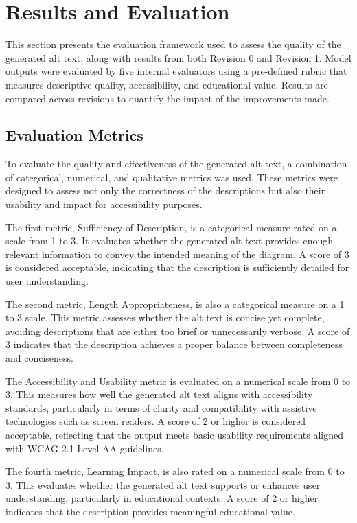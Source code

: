 \documentclass[11pt]{article}
\begin{document}
\section{Results and Evaluation}

This section presents the evaluation framework used to assess the quality of the generated alt text, along with results from both Revision 0 and Revision 1. Model outputs were evaluated by five internal evaluators using a pre-defined rubric that measures descriptive quality, accessibility, and educational value. Results are compared across revisions to quantify the impact of the improvements made.

\subsection{Evaluation Metrics} 
To evaluate the quality and effectiveness of the generated alt text, a combination of categorical, numerical, and qualitative metrics was used. 
These metrics were designed to assess not only the correctness of the descriptions but also their usability and impact for accessibility purposes.

The first metric, Sufficiency of Description, is a categorical measure rated on a scale from 1 to 3. It evaluates whether the generated alt text 
provides enough relevant information to convey the intended meaning of the diagram. A score of 3 is considered acceptable, indicating that 
the description is sufficiently detailed for user understanding.

The second metric, Length Appropriateness, is also a categorical measure on a 1 to 3 scale. This metric assesses whether the alt text is concise yet 
complete, avoiding descriptions that are either too brief or unnecessarily verbose. A score of 3 indicates that the description achieves a proper 
balance between completeness and conciseness.

The Accessibility and Usability metric is evaluated on a numerical scale from 0 to 3. This measures how well the generated alt text aligns with 
accessibility standards, particularly in terms of clarity and compatibility with assistive technologies such as screen readers. A score of 2 or higher 
is considered acceptable, reflecting that the output meets basic usability requirements aligned with WCAG 2.1 Level AA guidelines.

The fourth metric, Learning Impact, is also rated on a numerical scale from 0 to 3. This evaluates whether the generated alt text supports or enhances 
user understanding, particularly in educational contexts. A score of 2 or higher indicates that the description provides meaningful educational value.
\end{document}
